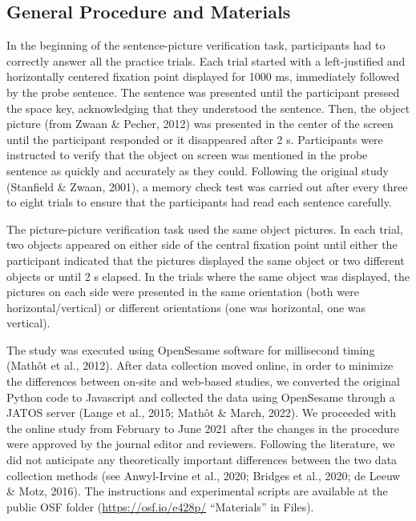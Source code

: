 \documentclass[
  man]{apa7}
\begin{document}
\hypertarget{general-procedure-and-materials}{%
\subsection{General Procedure and Materials}\label{general-procedure-and-materials}}

In the beginning of the sentence-picture verification task, participants had to correctly answer all the practice trials. Each trial started with a left-justified and horizontally centered fixation point displayed for 1000 ms, immediately followed by the probe sentence. The sentence was presented until the participant pressed the space key, acknowledging that they understood the sentence. Then, the object picture (from Zwaan \& Pecher, 2012) was presented in the center of the screen until the participant responded or it disappeared after 2 s. Participants were instructed to verify that the object on screen was mentioned in the probe sentence as quickly and accurately as they could. Following the original study (Stanfield \& Zwaan, 2001), a memory check test was carried out after every three to eight trials to ensure that the participants had read each sentence carefully.

The picture-picture verification task used the same object pictures. In each trial, two objects appeared on either side of the central fixation point until either the participant indicated that the pictures displayed the same object or two different objects or until 2 s elapsed. In the trials where the same object was displayed, the pictures on each side were presented in the same orientation (both were horizontal/vertical) or different orientations (one was horizontal, one was vertical).

The study was executed using OpenSesame software for millisecond timing (Mathôt et al., 2012). After data collection moved online, in order to minimize the differences between on-site and web-based studies, we converted the original Python code to Javascript and collected the data using OpenSesame through a JATOS server (Lange et al., 2015; Mathôt \& March, 2022). We proceeded with the online study from February to June 2021 after the changes in the procedure were approved by the journal editor and reviewers. Following the literature, we did not anticipate any theoretically important differences between the two data collection methods (see Anwyl-Irvine et al., 2020; Bridges et al., 2020; de Leeuw \& Motz, 2016). The instructions and experimental scripts are available at the public OSF folder (\url{https://osf.io/e428p/} ``Materials'' in Files).
\end{document}
